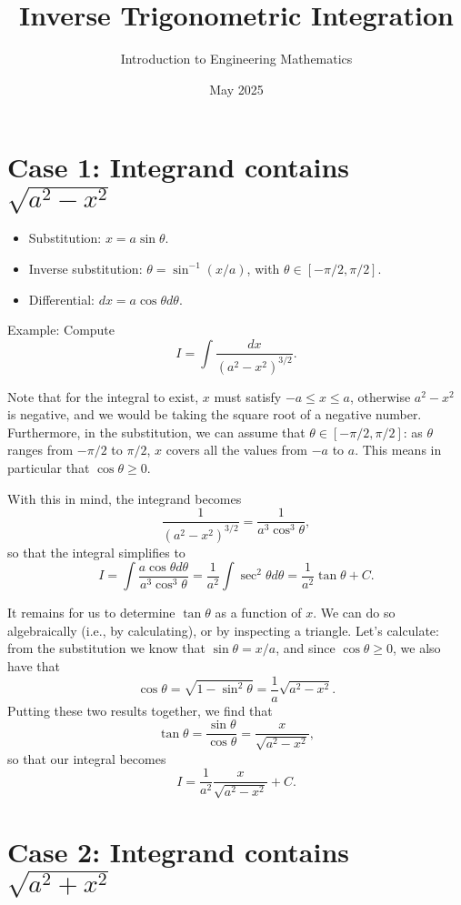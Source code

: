 \documentclass{article}
\title{Inverse Trigonometric Integration}
\author{Introduction to Engineering Mathematics}
\date{May 2025}
\begin{document}
\maketitle
\section*{Case 1: Integrand contains $\sqrt{a^2 - x^2}$}

\begin{itemize}
\item Substitution: $x = a \sin \theta$.
\item Inverse substitution: $\theta = \sin^{-1}(x/a)$, with $\theta \in [-\pi/2, \pi/2]$.
\item Differential: $dx = a \cos \theta d\theta$.
\end{itemize}

Example: Compute
\[
  I = \int\frac{dx}{(a^2 - x^2)^{3/2}}.
\]

Note that for the integral to exist, $x$ must satisfy $-a \le x \le a$, otherwise $a^2 - x^2$ is negative, and we would be taking the square root of a negative number. Furthermore, in the substitution, we can assume that $\theta \in [-\pi/2, \pi/2]$: as $\theta$ ranges from $-\pi/2$ to $\pi/2$, $x$ covers all the values from $-a$ to $a$. This means in particular that $\cos \theta \ge 0$.

With this in mind, the integrand becomes
\[
  \frac{1}{(a^2 - x^2)^{3/2}} = \frac{1}{a^3 \cos^3 \theta},
\]
so that the integral simplifies to
\[
  I = \int \frac{a \cos \theta d \theta}{a^3 \cos^3 \theta} = \frac{1}{a^2} \int \sec^2 \theta d \theta = \frac{1}{a^2} \tan \theta + C.
\]

It remains for us to determine $\tan \theta$ as a function of $x$. We can do so algebraically (i.e., by calculating), or by inspecting a triangle. Let's calculate: from the substitution we know that $\sin \theta = x/a$, and since $\cos \theta \ge 0$, we also have that
\[
  \cos \theta = \sqrt{1 - \sin^2 \theta} = \frac{1}{a} \sqrt{a^2 - x^2}.
\]
Putting these two results together, we find that
\[
  \tan \theta = \frac{\sin \theta}{\cos \theta} = \frac{x}{\sqrt{a^2 - x^2}},
\]
so that our integral becomes
\[
  I = \frac{1}{a^2} \frac{x}{\sqrt{a^2 - x^2}} + C.
\]

\section*{Case 2: Integrand contains $\sqrt{a^2 + x^2}$}
\end{document}
